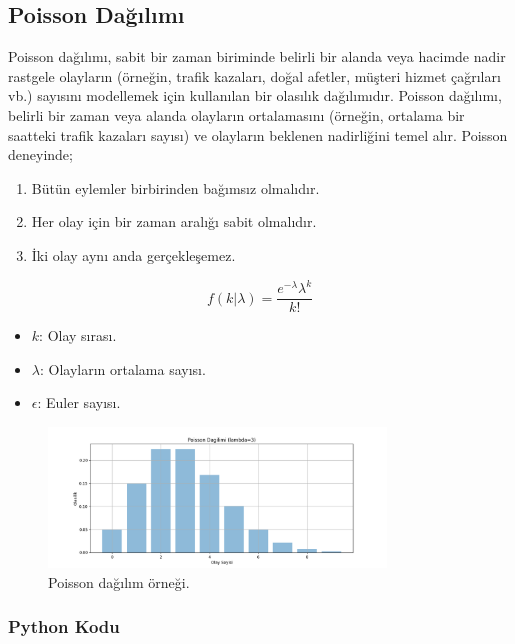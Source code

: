 \newpage

\subsection{Poisson Dağılımı}
Poisson dağılımı, sabit bir zaman biriminde belirli bir alanda veya hacimde nadir rastgele olayların (örneğin, trafik kazaları, doğal afetler, müşteri hizmet çağrıları vb.) sayısını modellemek için kullanılan bir olasılık dağılımıdır. Poisson dağılımı, belirli bir zaman veya alanda olayların ortalamasını (örneğin, ortalama bir saatteki trafik kazaları sayısı) ve olayların beklenen nadirliğini temel alır. Poisson deneyinde;

\begin{enumerate}
	\item Bütün eylemler birbirinden bağımsız olmalıdır.
	\item Her olay için bir zaman aralığı sabit olmalıdır.
	\item İki olay aynı anda gerçekleşemez.
\end{enumerate}

\[f(k|\lambda) = \frac{e^{-\lambda} \lambda^k}{k!}\]
\begin{itemize}
	\item $k$: Olay sırası.
	\item $\lambda$: Olayların ortalama sayısı.
	\item $\epsilon$: Euler sayısı.
\end{itemize}

\begin{figure}[h]
    \centering
    \includegraphics[width=0.8\textwidth]{images/poisson_distribution.png}
    \caption{Poisson dağılım örneği.}
    \label{fig:enter-label}
\end{figure}

\subsubsection{Python Kodu}

